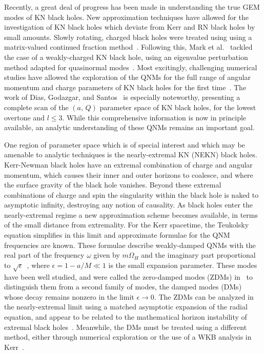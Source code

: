 \begin{refsection}
Recently, a great deal of progress has been made in understanding the true GEM modes of KN black holes. 
New approximation techniques have allowed for the investigation of KN black holes which deviate from Kerr and RN black holes by small amounts. 
Slowly rotating, charged black holes were treated using using a matrix-valued continued fraction method~\cite{Pani:2013ija,Pani:2013wsa}. 
Following this, Mark et al.~\cite{Mark:2014aja} tackled the case of a weakly-charged KN black hole, using an eigenvalue perturbation method adapted for quasinormal modes~\cite{Yang:2014tla, Zimmerman:2014aha}.
Most excitingly, challenging numerical studies have allowed the exploration of the QNMs for the full range of angular momentum and charge parameters of KN black holes for the first time~\cite{Zilhao:2014wqa, Dias:2015wqa}. 
The work of Dias, Godazgar, and Santos~\cite{Dias:2015wqa} is especially noteworthy, presenting a complete scan of the $(a,\,Q)$ parameter space of KN black holes, for the lowest overtone and $l\leq 3$.
While this comprehensive information is now in principle available, an analytic understanding of these QNMs remains an important goal.

One region of parameter space which is of special interest and which may be amenable to analytic techniques is the nearly-extremal KN (NEKN) black holes. Kerr-Newman black holes have an extremal combination of charge and angular momentum, which causes their inner and outer horizons to coalesce, and where the surface gravity of the black hole vanishes.
Beyond these extremal combinations of charge and spin the singularity within the black hole is naked to asymptotic infinity, destroying any notion of causality. 
As black holes enter the nearly-extremal regime a new approximation scheme  becomes available, in terms of the small distance from extremality. 
For the Kerr spacetime, the Teukolsky equation simplifies in this limit and approximate formulae for the QNM frequencies are known.
These formulae describe weakly-damped QNMs with the real part of the frequency $\omega$ given by $m \Omega_H$ and the imaginary part proportional to $\sqrt{\epsilon}$~\cite{TeukolskyPress1974,Detweiler1980,Andersson2000,Glampedakis2001,Hod2008a,Yang:2012he,Yang:2012pj,Yang:2013uba}, where $\epsilon  = 1- a/M \ll 1$ is the small expansion 
parameter. 
These modes have been well studied, and were called the zero-damped modes (ZDMs) in~\cite{Yang:2012pj,Yang:2013uba} to distinguish them from a second family of modes, the damped modes (DMs) whose decay remains nonzero in the limit $\epsilon \to 0$. 
The ZDMs can be analyzed in the nearly-extremal limit using a matched asymptotic expansion of the radial equation, and appear to be related to the mathematical horizon instability of extremal black holes~\cite{Aretakis:2012ei,Aretakis:2013dpa,Reiris:2013efa}.
Meanwhile, the DMs must be treated using a different method, either through numerical exploration or the use of a WKB analysis in Kerr~\cite{Yang:2012he}.


\end{refsection}
